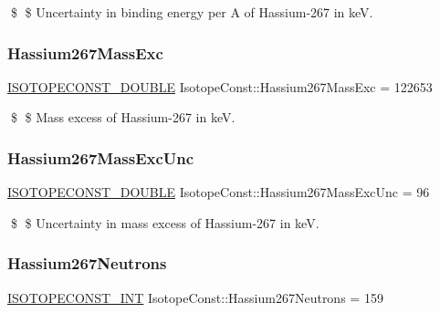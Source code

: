 \$ \$ Uncertainty in binding energy per A of Hassium-\/267 in keV. \mbox{\label{group___isotope_const-_hassium-_hs267_gacfa1c1a85d65d72b7754dbb3d035d63e}} 
\subsubsection{\texorpdfstring{Hassium267\+Mass\+Exc}{Hassium267MassExc}}
{\footnotesize\ttfamily \mbox{\hyperlink{group___isotope_const-_macros_ga8f45a7272ce02c0b4c65c44636ed719a}{I\+S\+O\+T\+O\+P\+E\+C\+O\+N\+S\+T\+\_\+\+D\+O\+U\+B\+LE}} Isotope\+Const\+::\+Hassium267\+Mass\+Exc = 122653}

\$ \$ Mass excess of Hassium-\/267 in keV. \mbox{\label{group___isotope_const-_hassium-_hs267_ga3da7c0b47b3f16589bdd9632795a4db1}} 
\subsubsection{\texorpdfstring{Hassium267\+Mass\+Exc\+Unc}{Hassium267MassExcUnc}}
{\footnotesize\ttfamily \mbox{\hyperlink{group___isotope_const-_macros_ga8f45a7272ce02c0b4c65c44636ed719a}{I\+S\+O\+T\+O\+P\+E\+C\+O\+N\+S\+T\+\_\+\+D\+O\+U\+B\+LE}} Isotope\+Const\+::\+Hassium267\+Mass\+Exc\+Unc = 96}

\$ \$ Uncertainty in mass excess of Hassium-\/267 in keV. \mbox{\label{group___isotope_const-_hassium-_hs267_ga65abe508e786b7d7a4ad4327f725dcad}} 
\subsubsection{\texorpdfstring{Hassium267\+Neutrons}{Hassium267Neutrons}}
{\footnotesize\ttfamily \mbox{\hyperlink{group___isotope_const-_macros_ga5f18360b3e99483a35c32d789e62621c}{I\+S\+O\+T\+O\+P\+E\+C\+O\+N\+S\+T\+\_\+\+I\+NT}} Isotope\+Const\+::\+Hassium267\+Neutrons = 159}

